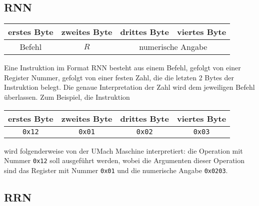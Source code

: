 \subsection{RNN}
\label{subsec:RNN}

\begin{center}
  \begin{tabular}{|*{4}{c|}} \hline
    erstes Byte & zweites Byte  & drittes Byte  & viertes Byte \\\hline\hline
    Befehl      & $R$ & \multicolumn{2}{c|}{numerische Angabe} \\\hline
  \end{tabular}
\end{center}

Eine Instruktion im Format RNN besteht aus einem Befehl, gefolgt von einer
Register Nummer, gefolgt von einer festen Zahl, die die letzten 2 Bytes der
Instruktion belegt. Die genaue Interpretation der Zahl wird dem jeweiligen
Befehl überlassen.
Zum Beispiel, die Instruktion
\begin{center}
  \begin{tabular}{|*{4}{c|}} \hline
    erstes Byte & zweites Byte  & drittes Byte  & viertes Byte \\\hline\hline
    \texttt{0x12} & \texttt{0x01} & \texttt{0x02} & \texttt{0x03} \\\hline
  \end{tabular}
\end{center}
wird folgenderweise von der UMach Maschine interpretiert: die Operation mit
Nummer \texttt{0x12} soll ausgeführt werden, wobei die Argumenten dieser
Operation sind das Register mit Nummer \texttt{0x01} und die numerische
Angabe \texttt{0x0203}.



\subsection{RRN}
\label{subsec:RRN}

